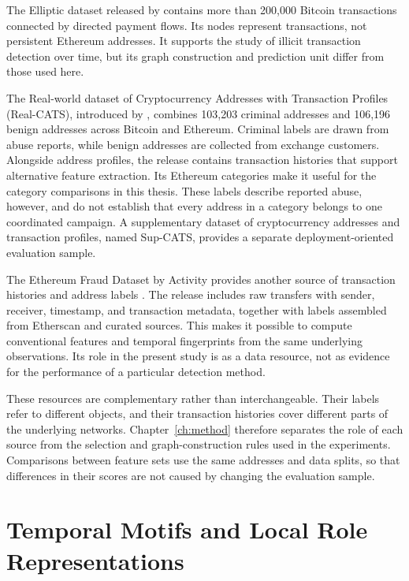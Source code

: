 \documentclass{thesisclass}
\begin{document}
The Elliptic dataset released by \citet{weber2019bitcoin} contains more than
200,000 Bitcoin transactions connected by directed payment flows. Its nodes
represent transactions, not persistent Ethereum addresses. It supports the
study of illicit transaction detection over time, but its graph construction
and prediction unit differ from those used here.

The Real-world dataset of Cryptocurrency Addresses with Transaction Profiles
(Real-CATS), introduced by \citet{shi2025realcats}, combines 103,203 criminal
addresses and 106,196 benign addresses across Bitcoin and Ethereum. Criminal
labels are drawn from abuse reports, while benign addresses are collected from
exchange customers. Alongside address profiles, the release contains
transaction histories that support alternative feature extraction. Its
Ethereum categories make it useful for the category comparisons in this
thesis. These labels describe reported abuse, however, and do not establish
that every address in a category belongs to one coordinated campaign.
A supplementary dataset of cryptocurrency addresses and transaction profiles,
named Sup-CATS, provides a separate deployment-oriented evaluation sample.

The Ethereum Fraud Dataset by Activity provides another source of transaction
histories and address labels \citep{fesevu2025ethfraud}. The release includes raw
transfers with sender, receiver, timestamp, and transaction metadata, together
with labels assembled from Etherscan and curated sources. This makes it
possible to compute conventional features and temporal fingerprints from the
same underlying observations. Its role in the present study is as a data
resource, not as evidence for the performance of a particular detection method.

These resources are complementary rather than interchangeable. Their labels
refer to different objects, and their transaction histories cover different
parts of the underlying networks. Chapter~\ref{ch:method} therefore separates
the role of each source from the selection and graph-construction rules used
in the experiments. Comparisons between feature sets use the same addresses
and data splits, so that differences in their scores are not caused by changing
the evaluation sample.

\section{Temporal Motifs and Local Role Representations}
\label{sec:related_temporal_motifs}
\end{document}
